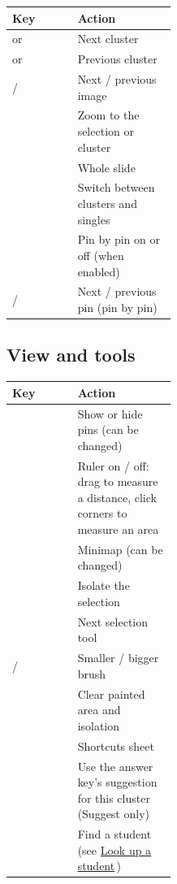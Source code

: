 \begin{multicols}{2}
\begingroup\renewcommand{\arraystretch}{1.35}
\noindent\begin{tabularx}{\linewidth}{>{\raggedright\arraybackslash}p{0.4\linewidth}Y}
\toprule
\textbf{Key} & \textbf{Action} \\
\midrule
\keycap{]} or  & Next cluster \\
\keycap{[} or  & Previous cluster \\
\keycap{\cmdsym{}}\keyplus{}\keycap{\ensuremath{\rightarrow}} / \keycap{\cmdsym{}}\keyplus{}\keycap{\ensuremath{\leftarrow}} & Next / previous image \\
 & Zoom to the selection or cluster \\
 & Whole slide \\
 & Switch between clusters and singles \\
 & Pin by pin on or off (when enabled) \\
\keycap{\ensuremath{\rightarrow}} / \keycap{\ensuremath{\leftarrow}} & Next / previous pin (pin by pin) \\
\bottomrule
\end{tabularx}\endgroup\par\medskip

\subsection{View and tools}\label{sec:shortcuts:view-and-tools}

\begingroup\renewcommand{\arraystretch}{1.35}
\noindent\begin{tabularx}{\linewidth}{>{\raggedright\arraybackslash}p{0.4\linewidth}Y}
\toprule
\textbf{Key} & \textbf{Action} \\
\midrule
{} & Show or hide pins (can be changed) \\
 & Ruler on / off: drag to measure a distance, click corners to measure an area \\
 & Minimap (can be changed) \\
 & Isolate the selection \\
 & Next selection tool \\
\keycap{-} / \keycap{=} & Smaller / bigger brush \\
 & Clear painted area and isolation \\
 & Shortcuts sheet \\
 & Use the answer key's suggestion for this cluster (Suggest only) \\
\keycap{/} & Find a student (see \href{https://github.com/agadin/micro-speed-grader/blob/main/docs/help/students.md}{Look up a student}\,\onlinemark{}) \\
\bottomrule
\end{tabularx}\endgroup\par\medskip


\end{multicols}
